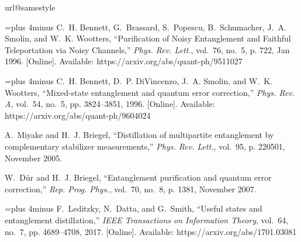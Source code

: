 \documentclass[journal,onecolumn]{IEEEtran}
\begin{document}
%
%



\begin{thebibliography}{10}
\providecommand{\url}[1]{#1}
\csname url@samestyle\endcsname
\providecommand{\newblock}{\relax}
\providecommand{\bibinfo}[2]{#2}
\providecommand{\BIBentrySTDinterwordspacing}{\spaceskip=0pt\relax}
\providecommand{\BIBentryALTinterwordstretchfactor}{4}
\providecommand{\BIBentryALTinterwordspacing}{\spaceskip=\fontdimen2\font plus
\BIBentryALTinterwordstretchfactor\fontdimen3\font minus
  \fontdimen4\font\relax}
\providecommand{\BIBforeignlanguage}[2]{{%
\expandafter\ifx\csname l@#1\endcsname\relax
\typeout{** WARNING: IEEEtran.bst: No hyphenation pattern has been}%
\typeout{** loaded for the language `#1'. Using the pattern for}%
\typeout{** the default language instead.}%
\else
\language=\csname l@#1\endcsname
\fi
#2}}
\providecommand{\BIBdecl}{\relax}
\BIBdecl

\BIBentryALTinterwordspacing
C.~H. Bennett, G.~Brassard, S.~Popescu, B.~Schumacher, J.~A. Smolin, and W.~K.
  Wootters, ``{Purification of Noisy Entanglement and Faithful Teleportation
  via Noisy Channels},'' \emph{Phys. Rev. Lett.}, vol.~76, no.~5, p. 722, Jan
  1996. [Online]. Available: \url{https://arxiv.org/abs/quant-ph/9511027}
\BIBentrySTDinterwordspacing

\BIBentryALTinterwordspacing
C.~H. Bennett, D.~P. DiVincenzo, J.~A. Smolin, and W.~K. Wootters,
  ``{Mixed-state entanglement and quantum error correction},'' \emph{Phys. Rev.
  A}, vol.~54, no.~5, pp. 3824--3851, 1996. [Online]. Available:
  \url{https://arxiv.org/abs/quant-ph/9604024}
\BIBentrySTDinterwordspacing

A.~Miyake and H.~J. Briegel, ``Distillation of multipartite entanglement by
  complementary stabilizer measurements,'' \emph{Phys. Rev. Lett.}, vol.~95, p.
  220501, November 2005.

W.~D{\"u}r and H.~J. Briegel, ``Entanglement purification and quantum error
  correction,'' \emph{Rep. Prog. Phys.}, vol.~70, no.~8, p. 1381, November
  2007.

\BIBentryALTinterwordspacing
F.~Leditzky, N.~Datta, and G.~Smith, ``Useful states and entanglement
  distillation,'' \emph{IEEE Transactions on Information Theory}, vol.~64,
  no.~7, pp. 4689--4708, 2017. [Online]. Available:
  \url{https://arxiv.org/abs/1701.03081}
\BIBentrySTDinterwordspacing


\end{thebibliography}
\end{document}
